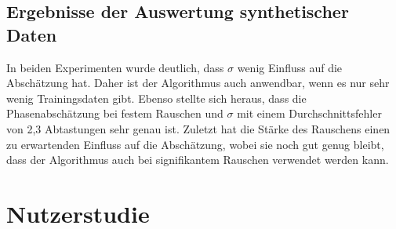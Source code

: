 \documentclass{llncs}
\begin{document}
\subsection{Ergebnisse der Auswertung synthetischer Daten}
In beiden Experimenten wurde deutlich, dass $\sigma$ wenig Einfluss auf die Abschätzung hat. Daher ist der Algorithmus auch anwendbar, wenn es nur sehr wenig Trainingsdaten gibt. Ebenso stellte sich heraus, dass die Phasenabschätzung bei festem Rauschen und $\sigma$ mit einem Durchschnittsfehler von 2,3 Abtastungen sehr genau ist. Zuletzt hat die Stärke des Rauschens einen zu erwartenden Einfluss auf die Abschätzung, wobei sie noch gut genug bleibt, dass der Algorithmus auch bei signifikantem Rauschen verwendet werden kann.

\section{Nutzerstudie}
\end{document}
